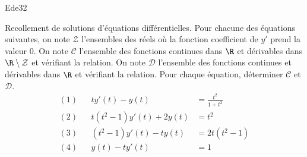 \begin{tiny}Ede32\end{tiny} Recollement de solutions d'équations différentielles.\newline
Pour chacune des équations suivantes, on note $\mathcal{Z}$ l'ensembles des réels où la fonction coefficient de $y'$ prend la valeur $0$. On note $\mathcal{C}$ l'ensemble des fonctions continues dans $\R$ et dérivables dans $\R\setminus \mathcal{Z}$ et vérifiant la relation. On note $\mathcal{D}$ l'ensemble des fonctions continues et dérivables dans $\R$ et vérifiant la relation.\newline
Pour chaque équation, déterminer $\mathcal{C}$ et $\mathcal{D}$.
\begin{align*}
 (1)& &ty'(t)-y(t) &= \frac{t^2}{1+t^2}\\
 (2)& &t(t^2-1)y'(t)+2y(t) &= t^2 \\
 (3)& &(t^2-1)y'(t)-ty(t) &= 2t(t^2-1) \\
 (4)& &y(t)-ty'(t) &= 1
\end{align*}
